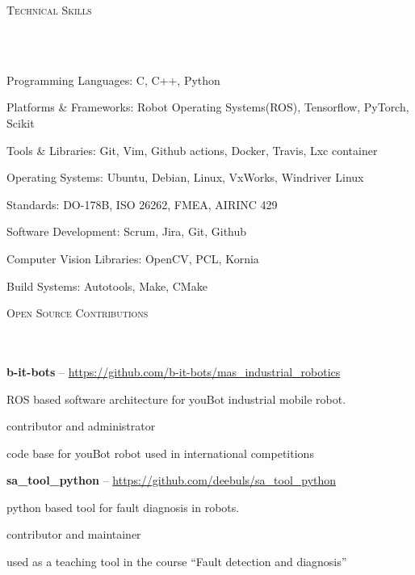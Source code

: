 \documentclass{article}
\newcommand{\header}[1]{{
\hspace*{-15pt}\vspace*{6pt} \textsc{#1}} \vspace*{-6pt} 
\lineunder
}
\newcommand{\lineunder}{
\vspace*{-8pt} \\ \hspace*{-18pt} 
\hrulefill \\
}
\newcommand{\employer}[4]{{
\vspace*{2pt}%
\textbf{#1} #2 \hfill #3\\ #4 \vspace*{2pt}}
}
\renewcommand{\labelitemii}{
	\raisebox{0.3ex}{\tiny\textbullet}
}
\newenvironment{bullet-list-major}{
\begin{list}{\labelitemii}{\setlength\leftmargin{3pt} 
\topsep 0pt \itemsep -2pt}}{\vspace*{4pt}\end{list}
}
\newenvironment{bullet-list-minor}{
\begin{list}{\labelitemii}{\setlength\leftmargin{15pt} 
\topsep 0pt \itemsep -2pt}}{\vspace*{4pt}\end{list}
}
\begin{document}
\newpage


\vspace*{4pt}%
\header{Technical Skills}
    \begin{bullet-list-major}
    \item Programming Languages: C, C++, Python
    \vspace{2pt}
    \item Platforms \& Frameworks: Robot Operating Systems(ROS), Tensorflow, PyTorch, Scikit
    \vspace{2pt}
    \item Tools \& Libraries: Git, Vim, Github actions, Docker, Travis, Lxc container
    \vspace{2pt}
    \item Operating Systems: Ubuntu, Debian, Linux, VxWorks, Windriver Linux
    \vspace{2pt}
\item Standards:  DO-178B, ISO 26262, FMEA, AIRINC 429
    \vspace{2pt}
\item Software Development: Scrum, Jira, Git, Github
    \vspace{2pt}
\item Computer Vision Libraries: OpenCV, PCL, Kornia
    \vspace{2pt}
\item Build Systems: Autotools, Make, CMake
    \end{bullet-list-major}


\vspace*{4pt}%
\header{Open Source Contributions}

\employer{b-it-bots}{-- \url{https://github.com/b-it-bots/mas\_industrial\_robotics}}{}{}
\begin{bullet-list-minor}
    \item ROS based software architecture for youBot industrial mobile robot.
    \item contributor and administrator
    \item code base for youBot robot used in international competitions
\end{bullet-list-minor}
\employer{sa\_tool\_python}{-- \url{https://github.com/deebuls/sa_tool_python} }{}
    {}
    \begin{bullet-list-minor}
    \item python based tool for fault diagnosis in robots.
    \item contributor and maintainer
    \item used as a teaching tool in the course ``Fault detection and diagnosis''
    \end{bullet-list-minor}
\end{document}
